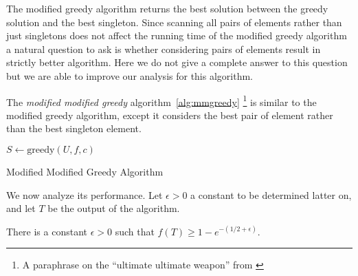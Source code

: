 The modified greedy algorithm returns the best solution between the greedy solution and the best singleton.
Since scanning all pairs of elements rather than just singletons does not affect the running time of the modified greedy algorithm a natural question to ask is whether considering pairs of elements result in strictly better algorithm.
Here we do not give a complete answer to this question but we are able to improve our analysis for this algorithm. 

The \emph{modified modified greedy} algorithm~\ref{alg:mmgreedy} 
\footnote{A paraphrase on the ``ultimate ultimate weapon'' from \cite{ninjago2017}}
is similar to the  modified greedy algorithm, 
except it considers the best pair of element rather than the best singleton element.


\begin{algorithm}[H]
\label{alg:mmgreedy}



$S \leftarrow \text{greedy}(U, f, c)$
\\
\caption{Modified Modified Greedy Algorithm}
\end{algorithm}

We now analyze its performance.
Let $\epsilon > 0$ a constant to be determined latter on, and let $T$ be the output of 
the algorithm.

\begin{theorem}
There is a constant $\epsilon > 0$ such that $f(T) \geq 1 - e^{-(1/2 + \epsilon)}$.
\end{theorem}

